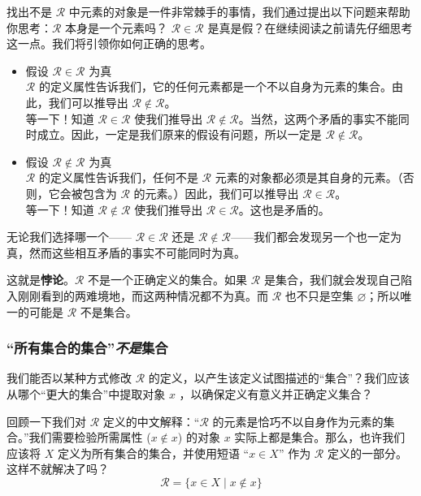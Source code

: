 找出不是 $\mathcal{R}$ 中元素的对象是一件非常棘手的事情，我们通过提出以下问题来帮助你思考：$\mathcal{R}$ 本身是一个元素吗？ $\mathcal{R} \in \mathcal{R}$ 是真是假？在继续阅读之前请先仔细思考这一点。我们将引领你如何正确的思考。

\begin{itemize}
    \item 假设 $\mathcal{R} \in \mathcal{R}$ 为真 \\
    $\mathcal{R}$ 的定义属性告诉我们，它的任何元素都是一个不以自身为元素的集合。由此，我们可以推导出 $\mathcal{R} \notin \mathcal{R}$。\\
    等一下！知道 $\mathcal{R} \in \mathcal{R}$ 使我们推导出 $\mathcal{R} \notin \mathcal{R}$。当然，这两个矛盾的事实不能同时成立。因此，一定是我们原来的假设有问题，所以一定是 $\mathcal{R} \notin \mathcal{R}$。
    \item 假设 $\mathcal{R} \notin \mathcal{R}$ 为真 \\
    $\mathcal{R}$ 的定义属性告诉我们，任何不是 $\mathcal{R}$ 元素的对象都必须是其自身的元素。（否则，它会被包含为 $\mathcal{R}$ 的元素。）因此，我们可以推导出 $\mathcal{R} \in \mathcal{R}$。\\
    等一下！知道 $\mathcal{R} \notin \mathcal{R}$ 使我们推导出 $\mathcal{R} \in \mathcal{R}$。这也是矛盾的。
\end{itemize}
无论我们选择哪一个—— $\mathcal{R} \in \mathcal{R}$ 还是 $\mathcal{R} \notin \mathcal{R}$——我们都会发现另一个也一定为真，然而这些相互矛盾的事实不可能同时为真。

这就是\textbf{悖论}。$\mathcal{R}$ 不是一个正确定义的集合。如果 $\mathcal{R}$ 是集合，我们就会发现自己陷入刚刚看到的两难境地，而这两种情况都不为真。而 $\mathcal{R}$ 也不只是空集 $\varnothing$；所以唯一的可能是 $\mathcal{R}$ 不是集合。

\subsubsection*{``所有集合的集合''\textit{不是}集合}

我们能否以某种方式修改 $\mathcal{R}$ 的定义，以产生该定义试图描述的``集合''？我们应该从哪个``更大的集合''中提取对象 $x$ ，以确保定义有意义并正确定义集合？

回顾一下我们对 $\mathcal{R}$ 定义的中文解释：``$\mathcal{R}$ 的元素是恰巧不以自身作为元素的集合。''我们需要检验所需属性 ($x \notin x$) 的对象 $x$ 实际上都是集合。那么，也许我们应该将 $X$ 定义为所有集合的集合，并使用短语 ``$x \in X$'' 作为 $\mathcal{R}$ 定义的一部分。这样不就解决了吗？
\[\mathcal{R} = \{x \in X \mid x \notin x\}\]


